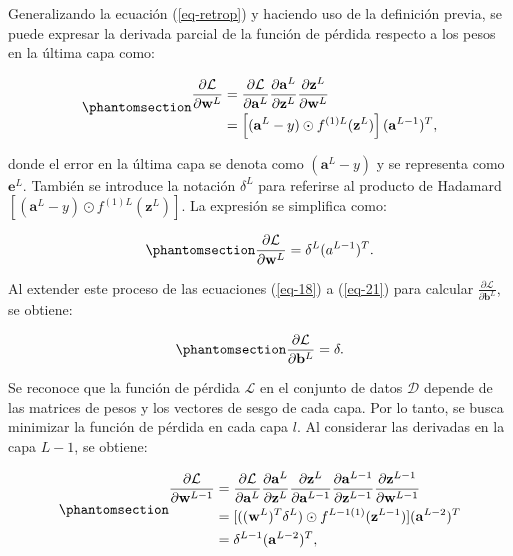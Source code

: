 \documentclass[
  us-letterpaper,
]{scrreprt}
\theoremstyle{plain}
\theoremstyle{definition}
\theoremstyle{definition}
\theoremstyle{plain}
\theoremstyle{remark}
\begin{document}
Generalizando la ecuación (\ref{eq-retrop}) y haciendo uso de la
definición previa, se puede expresar la derivada parcial de la función
de pérdida respecto a los pesos en la última capa como:

\begin{equation}\phantomsection\label{eq-20}{\begin{split}\frac{\partial \mathcal L}{\partial \mathbf w^L} &= \frac{\partial \mathcal L}{\partial \mathbf a^L}\frac{\partial \mathbf a^L}{\partial \mathbf z^L}\frac{\partial \mathbf z^L}{\partial \mathbf w^L}\\&= \left[(\mathbf a^L - y)\odot f^{(1)L}(\mathbf z^L)\right] (\mathbf a^{L-1})^T,\end{split}}\end{equation}

donde el error en la última capa se denota como \((\mathbf a^L - y)\) y
se representa como \(\mathbf e^L\). También se introduce la notación
\(\delta^L\) para referirse al producto de Hadamard
\([(\mathbf a^L - y)\odot f^{(1)L}(\mathbf z^L)]\). La expresión se
simplifica como:

\begin{equation}\phantomsection\label{eq-21}{\frac{\partial \mathcal L}{\partial \mathbf w^L} = \delta^L (a^{L-1})^T.}\end{equation}

Al extender este proceso de las ecuaciones (\ref{eq-18}) a (\ref{eq-21})
para calcular \(\frac{\partial \mathcal L}{\partial \mathbf b^L}\), se
obtiene:

\begin{equation}\phantomsection\label{eq-22}{\frac{\partial \mathcal L}{\partial \mathbf b^L} = \delta.}\end{equation}

Se reconoce que la función de pérdida \(\mathcal L\) en el conjunto de
datos \(\mathscr D\) depende de las matrices de pesos y los vectores de
sesgo de cada capa. Por lo tanto, se busca minimizar la función de
pérdida en cada capa \(l\). Al considerar las derivadas en la capa
\(L-1\), se obtiene:

\begin{equation}\phantomsection\label{eq-23}{
\begin{split}\frac{\partial \mathcal L}{\partial \mathbf w^{L-1}}&= \frac{\partial \mathcal L}{\partial \mathbf a^{L}}\frac{\partial \mathbf a^L}{\partial \mathbf z^{L}}\frac{\partial \mathbf z^L}{\partial \mathbf a^{L-1}}\frac{\partial \mathbf a^{L-1}}{\partial \mathbf z^{L-1}}\frac{\partial \mathbf z^{L-1}}{\partial \mathbf w^{L-1}}\\
&= [((\mathbf w^L)^T \delta^L)\odot f^{L-1(1)}(\mathbf z^{L-1})](\mathbf a^{L-2})^T\\
&= \delta^{L-1}(\mathbf a^{L-2})^T,\end{split}
}\end{equation}
\end{document}
